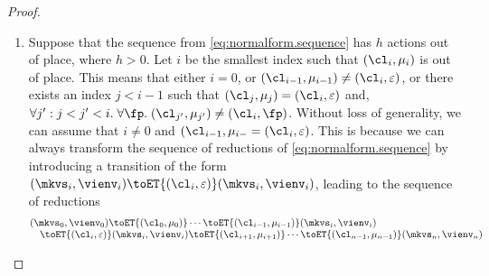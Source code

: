 \begin{proof}
\begin{enumerate}
\item Suppose that the sequence from \cref{eq:normalform.sequence} has $h$ actions out of place, 
where $h > 0$. Let $i$ be the smallest index such that $(\cl_{i}, \mu_{i})$ is out of place. 
This means that either $i = 0$, or $(\cl_{i-1}, \mu_{i-1}) \neq (\cl_{i}, \varepsilon)$, 
or there exists an index $j < i -1 $ such that $(\cl_{j}, \mu_{j}) = (\cl_{i}, \varepsilon)$ 
and, $\forall j': j < j' < i.\;\forall \fp.\;(\cl_{j'}, \mu_{j'}) \neq (\cl_{i}, \fp)$. 
Without loss of generality, we can assume that $i \neq 0$ and $(\cl_{i-1}, \mu_{i-} = (\cl_{i}, \varepsilon)$. 
This is because we can always transform the sequence of reductions of \cref{eq:normalform.sequence} by 
introducing a transition of the form $(\mkvs_{i}, \vienv_{i}) \toET{(\cl_{i}, \varepsilon)}
(\mkvs_{i}, \vienv_{i})$, leading to the sequence of reductions
\[
\begin{array}{@{}l@{}}
(\mkvs_{0}, \vienv_{0}) \toET{(\cl_{0}, \mu_{0})} \cdots \toET{(\cl_{i-1}, \mu_{i-1})}
(\mkvs_{i}, \vienv_{i}) \\
\quad \toET{(\cl_{i}, \varepsilon)} (\mkvs_{i}, \vienv_{i}) \toET{(\cl_{i+1}, \mu_{i+1})}
\cdots \toET{(\cl_{n-1}, \mu_{n-1})} (\mkvs_{n}, \vienv_{n})
\end{array}
\]


\end{enumerate}
\end{proof}
